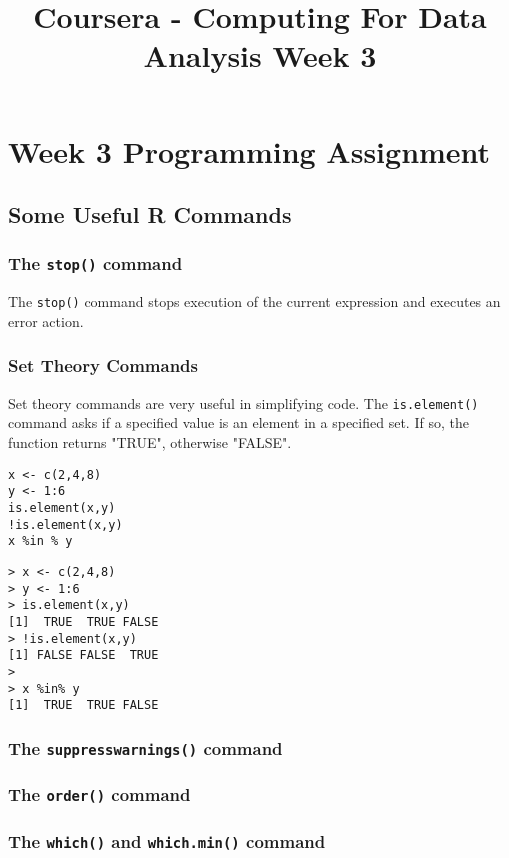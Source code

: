 \documentclass[]{article}
\title{Coursera - Computing For Data Analysis Week 3}
\begin{document}
\maketitle



\section{Week 3 Programming Assignment}
\subsection{Some Useful R Commands}

\subsubsection{The \texttt{stop()} command}
The \texttt{stop()} command stops execution of the current expression and executes an error action.

\subsubsection{Set Theory Commands}
Set theory commands are very useful in simplifying code. The \texttt{is.element()} command asks if a specified value is an element in a specified set. If so, the function returns "TRUE", otherwise "FALSE".

\begin{framed}
\begin{verbatim}
x <- c(2,4,8)
y <- 1:6
is.element(x,y)
!is.element(x,y)
x %in % y
\end{verbatim}
\end{framed}

\begin{verbatim}
> x <- c(2,4,8)
> y <- 1:6
> is.element(x,y)
[1]  TRUE  TRUE FALSE
> !is.element(x,y)
[1] FALSE FALSE  TRUE
> 
> x %in% y
[1]  TRUE  TRUE FALSE
\end{verbatim}

\subsubsection{The \texttt{suppresswarnings()} command}
\subsubsection{The \texttt{order()} command}
\subsubsection{The \texttt{which()} and \texttt{which.min()} command}
\end{document}
